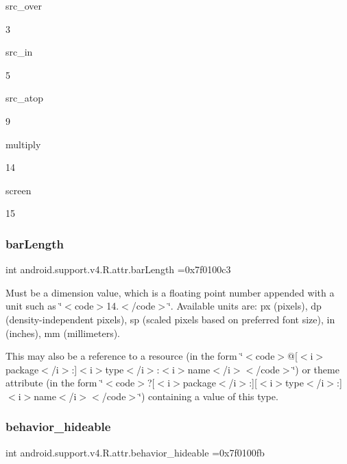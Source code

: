 {\ttfamily src\+\_\+over}

3

{\ttfamily src\+\_\+in}

5

{\ttfamily src\+\_\+atop}

9

{\ttfamily multiply}

14

{\ttfamily screen}

15\mbox{\label{classandroid_1_1support_1_1v4_1_1R_1_1attr_ad58969d24cd9bf6a2af3fdd44ca43dbf}} 
\subsubsection{\texorpdfstring{bar\+Length}{barLength}}
{\footnotesize\ttfamily int android.\+support.\+v4.\+R.\+attr.\+bar\+Length =0x7f0100c3\hspace{0.3cm}{\ttfamily [static]}}

Must be a dimension value, which is a floating point number appended with a unit such as \char`\"{}$<$code$>$14.\+5sp$<$/code$>$\char`\"{}. Available units are\+: px (pixels), dp (density-\/independent pixels), sp (scaled pixels based on preferred font size), in (inches), mm (millimeters). 

This may also be a reference to a resource (in the form \char`\"{}$<$code$>$@\mbox{[}$<$i$>$package$<$/i$>$\+:\mbox{]}$<$i$>$type$<$/i$>$\+:$<$i$>$name$<$/i$>$$<$/code$>$\char`\"{}) or theme attribute (in the form \char`\"{}$<$code$>$?\mbox{[}$<$i$>$package$<$/i$>$\+:\mbox{]}\mbox{[}$<$i$>$type$<$/i$>$\+:\mbox{]}$<$i$>$name$<$/i$>$$<$/code$>$\char`\"{}) containing a value of this type. \mbox{\label{classandroid_1_1support_1_1v4_1_1R_1_1attr_a4743a5bd4c43bcfe955c9904fe16c93e}} 
\subsubsection{\texorpdfstring{behavior\+\_\+hideable}{behavior\_hideable}}
{\footnotesize\ttfamily int android.\+support.\+v4.\+R.\+attr.\+behavior\+\_\+hideable =0x7f0100fb\hspace{0.3cm}{\ttfamily [static]}}


